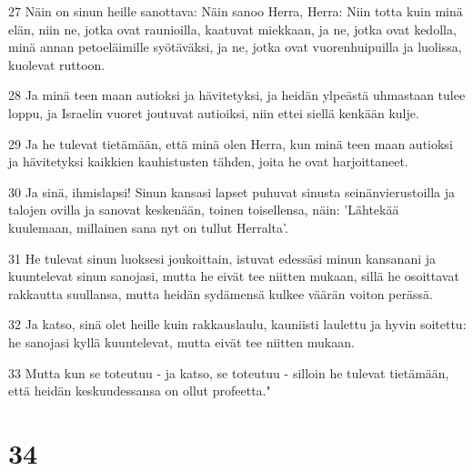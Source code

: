 \par 27 Näin on sinun heille sanottava: Näin sanoo Herra, Herra: Niin totta kuin minä elän, niin ne, jotka ovat raunioilla, kaatuvat miekkaan, ja ne, jotka ovat kedolla, minä annan petoeläimille syötäväksi, ja ne, jotka ovat vuorenhuipuilla ja luolissa, kuolevat ruttoon.
\par 28 Ja minä teen maan autioksi ja hävitetyksi, ja heidän ylpeästä uhmastaan tulee loppu, ja Israelin vuoret joutuvat autioiksi, niin ettei siellä kenkään kulje.
\par 29 Ja he tulevat tietämään, että minä olen Herra, kun minä teen maan autioksi ja hävitetyksi kaikkien kauhistusten tähden, joita he ovat harjoittaneet.
\par 30 Ja sinä, ihmislapsi! Sinun kansasi lapset puhuvat sinusta seinänvierustoilla ja talojen ovilla ja sanovat keskenään, toinen toisellensa, näin: 'Lähtekää kuulemaan, millainen sana nyt on tullut Herralta'.
\par 31 He tulevat sinun luoksesi joukoittain, istuvat edessäsi minun kansanani ja kuuntelevat sinun sanojasi, mutta he eivät tee niitten mukaan, sillä he osoittavat rakkautta suullansa, mutta heidän sydämensä kulkee väärän voiton perässä.
\par 32 Ja katso, sinä olet heille kuin rakkauslaulu, kauniisti laulettu ja hyvin soitettu: he sanojasi kyllä kuuntelevat, mutta eivät tee niitten mukaan.
\par 33 Mutta kun se toteutuu - ja katso, se toteutuu - silloin he tulevat tietämään, että heidän keskuudessansa on ollut profeetta."

\chapter{34}

